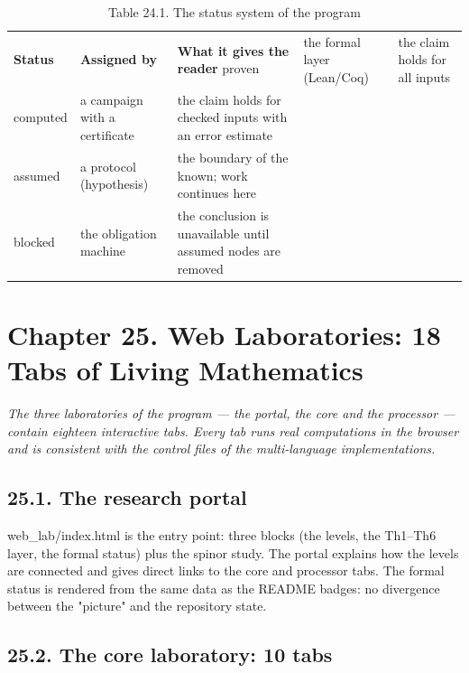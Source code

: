 \documentclass[11pt,a4paper]{article}
\begin{document}
\begin{table}[htbp]\centering\small
\caption{Table 24.1. The status system of the program}
\begin{tabular}{p{} p{} p{}}
\toprule
\textbf{Status} & \textbf{Assigned by} & \textbf{What it gives the reader}
\midrule
proven & the formal layer (Lean/Coq) & the claim holds for all inputs \\
computed & a campaign with a certificate & the claim holds for checked inputs with an error estimate \\
assumed & a protocol (hypothesis) & the boundary of the known; work continues here \\
blocked & the obligation machine & the conclusion is unavailable until assumed nodes are removed \\
\bottomrule
\end{tabular}
\end{table}

\section{Chapter 25. Web Laboratories: 18 Tabs of Living Mathematics}

\noindent\textit{\color{copper}The three laboratories of the program — the portal, the core and the processor — contain eighteen interactive tabs. Every tab runs real computations in the browser and is consistent with the control files of the multi-language implementations.}

\subsection{25.1. The research portal}

web\_lab/index.html is the entry point: three blocks (the levels, the Th1–Th6 layer, the formal status) plus the spinor study. The portal explains how the levels are connected and gives direct links to the core and processor tabs. The formal status is rendered from the same data as the README badges: no divergence between the "picture" and the repository state.

\subsection{25.2. The core laboratory: 10 tabs}
\end{document}
